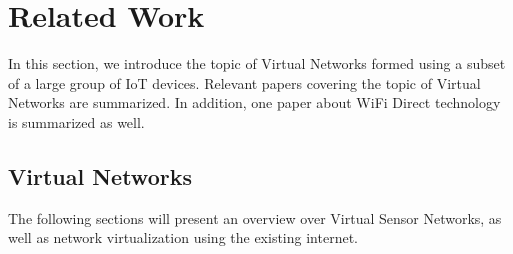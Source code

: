 \documentclass[12pt,journal]{IEEEtran}
\begin{document}

\section{Related Work}
In this section, we introduce the topic of Virtual Networks formed using a subset of a large group of IoT devices. Relevant papers covering the topic of Virtual Networks are summarized. In addition, one paper about WiFi Direct technology is summarized as well.

\subsection{Virtual Networks}
The following sections will present an overview over Virtual Sensor Networks, as well as network virtualization using the existing internet.
\end{document}
